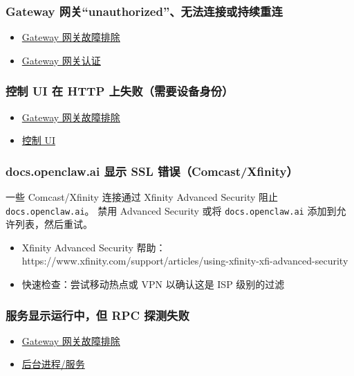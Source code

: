 \subsubsection{Gateway 网关“unauthorized”、无法连接或持续重连}


\begin{itemize}
  \item \href{/gateway/troubleshooting}{Gateway 网关故障排除}
  \item \href{/gateway/authentication}{Gateway 网关认证}
\end{itemize}


\subsubsection{控制 UI 在 HTTP 上失败（需要设备身份）}


\begin{itemize}
  \item \href{/gateway/troubleshooting}{Gateway 网关故障排除}
  \item \href{/web/control-ui\#insecure-http}{控制 UI}
\end{itemize}


\subsubsection{docs.openclaw.ai 显示 SSL 错误（Comcast/Xfinity）}


一些 Comcast/Xfinity 连接通过 Xfinity Advanced Security 阻止 \texttt{docs.openclaw.ai}。
禁用 Advanced Security 或将 \texttt{docs.openclaw.ai} 添加到允许列表，然后重试。

\begin{itemize}
  \item Xfinity Advanced Security 帮助：https://www.xfinity.com/support/articles/using-xfinity-xfi-advanced-security
  \item 快速检查：尝试移动热点或 VPN 以确认这是 ISP 级别的过滤
\end{itemize}


\subsubsection{服务显示运行中，但 RPC 探测失败}


\begin{itemize}
  \item \href{/gateway/troubleshooting}{Gateway 网关故障排除}
  \item \href{/gateway/background-process}{后台进程/服务}
\end{itemize}


